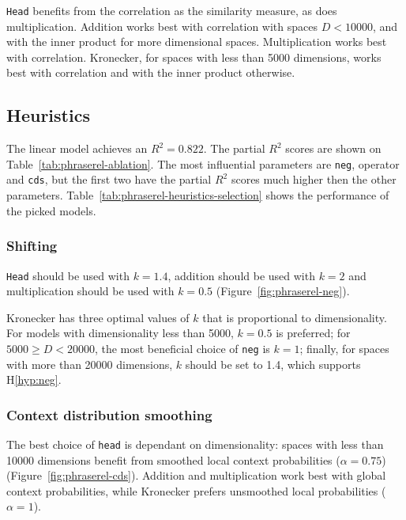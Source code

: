 \texttt{Head} benefits from the correlation as the similarity measure, as does multiplication. Addition works best with correlation with spaces $D < 10000$, and with the inner product for more dimensional spaces. Multiplication works best with correlation. Kronecker, for spaces with less than 5000 dimensions, works best with correlation and with the inner product otherwise.

\subsection{Heuristics}
\label{sec:heuristics-phraserel}




The linear model achieves an $R^2 = 0.822$. The partial $R^2$ scores are shown on Table~\ref{tab:phraserel-ablation}. The most influential parameters are \texttt{neg}, operator and \texttt{cds}, but the first two have the partial $R^2$ scores much higher then the other parameters. Table~\ref{tab:phraserel-heuristics-selection} shows the performance of the picked models.

\subsubsection{Shifting}
\label{sec:shifting-phraserel}

\texttt{Head} should be used with $k = 1.4$, addition should be used with $k = 2$ and multiplication should be used with $k = 0.5$ (Figure~\ref{fig:phraserel-neg}).

Kronecker has three optimal values of $k$ that is proportional to dimensionality. For models with dimensionality less than 5000, $k = 0.5$ is preferred; for $5000 \geq D < 20000$, the most beneficial choice of \texttt{neg} is $k = 1$; finally, for spaces with more than 20000 dimensions, $k$ should be set to 1.4, which supports H\ref{hyp:neg}.

\subsubsection{Context distribution smoothing}
\label{sec:cont-distr-smooth-phraserel}

The best choice of \texttt{head} is dependant on dimensionality: spaces with less than 10000 dimensions benefit from smoothed local context probabilities ($\alpha = 0.75$) (Figure~\ref{fig:phraserel-cds}). Addition and multiplication work best with global context probabilities, while Kronecker prefers unsmoothed local probabilities ($\alpha = 1$).

